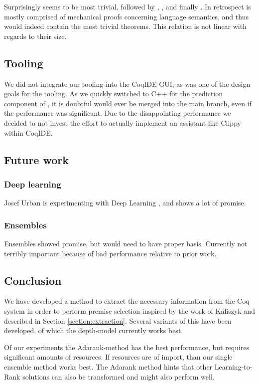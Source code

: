 Surprisingly \formalin seems to be most trivial, followed by \coq, \mathclasses, \corn and finally \mathcomp.
In retrospect \formalin is mostly comprised of mechanical proofs concerning language semantics, and thus would indeed contain the most trivial theorems.
This relation is not linear with regards to their size.

\subsection{Tooling}
We did not integrate our tooling into the CoqIDE GUI, as was one of the design goals for the \roerei tooling.
As we quickly switched to C++ for the prediction component of \roerei, it is doubtful \roerei would ever be merged into the \coq main branch,
even if the performance was significant.
Due to the disappointing performance we decided to not invest the effort to actually implement an assistant like Clippy within CoqIDE.

\subsection{Future work}
\subsubsection{Deep learning}
Josef Urban is experimenting with Deep Learning \cite{loos2017deep}, and shows a lot of promise.

\subsubsection{Ensembles}
Ensembles showed promise, but would need to have proper basis.
Currently not terribly important because of bad performance relative to prior work.


\subsection{Conclusion}
We have developed a method to extract the necessary information from the Coq system in order to perform premise selection
inspired by the work of Kaliszyk and described in Section \ref{section:extraction}.
Several variants of this have been developed, of which the depth-model currently works best.

Of our experiments the Adarank-method has the best performance, but requires significant amounts of resources.
If resources are of import, than our single ensemble method works best.
The Adarank method hints that other Learning-to-Rank solutions can also be transformed and might also perform well.

